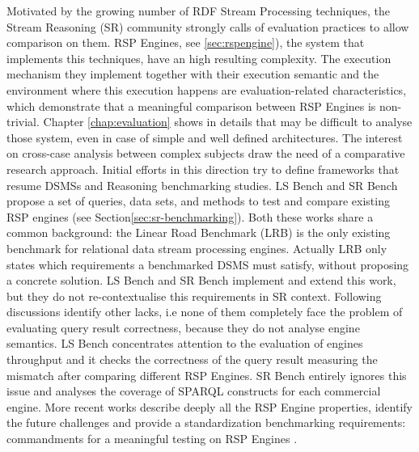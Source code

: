 Motivated by the growing number of RDF Stream Processing techniques, the Stream Reasoning (SR) community strongly calls of evaluation practices to allow comparison on them. RSP Engines, see \ref{sec:rspengine}), the system that implements this techniques, have an high resulting complexity. The execution mechanism they implement together with their execution semantic and the environment where this execution happens are evaluation-related characteristics, which demonstrate that a meaningful comparison between RSP Engines is non-trivial. Chapter 	\ref{chap:evaluation} shows in details that may be difficult to analyse those system, even in case of simple and well defined architectures. 
The interest on cross-case analysis between complex subjects draw the need of a comparative research approach. Initial efforts in this direction try to define frameworks that resume  DSMSs \cite{arasu2004linear} and Reasoning \cite{Guo2005} benchmarking studies. LS Bench and SR Bench propose a set of queries, data sets, and methods to test and compare existing RSP engines (see Section\ref{sec:sr-benchmarking}). Both these works share a common background: the Linear Road Benchmark (LRB) is the only existing benchmark for relational data stream processing engines. Actually LRB only states which requirements a benchmarked DSMS must satisfy, without proposing a concrete solution. LS Bench and SR Bench implement and extend this work, but they do not re-contextualise this requirements in SR context. Following discussions identify other lacks, i.e none of them completely face the problem of evaluating query result correctness, because they do not analyse engine semantics. LS Bench concentrates attention to the evaluation of engines throughput and it checks the correctness of the query result measuring the mismatch after comparing different RSP Engines. SR Bench entirely ignores this issue and analyses the coverage of SPARQL constructs for each commercial engine. More recent works describe deeply all the RSP Engine properties, identify the future challenges and provide a standardization benchmarking requirements: commandments for a meaningful testing on RSP Engines \cite{DBLP:conf/esws/ScharrenbachUMVB13}.

